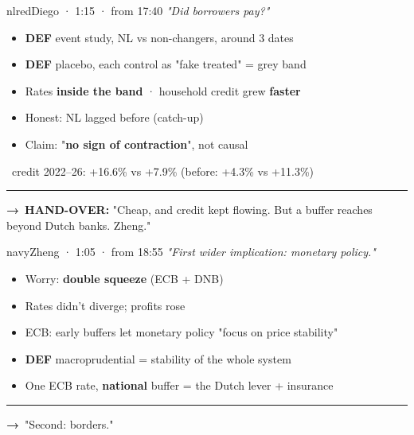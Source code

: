 \documentclass[10pt]{article}
\begin{document}
\begin{card}{nlred}{\hfill{\normalsize\mdseries Diego · 1:15 · from 17:40}}
{\large\itshape "Did borrowers pay?"}\par\smallskip
\begin{itemize}[label=\textcolor{nlred}{\textbullet}]\item \textcolor{gold!80!black}{\textbf{DEF}} event study, NL vs non-changers, around 3 dates\item \textcolor{gold!80!black}{\textbf{DEF}} placebo, each control as "fake treated" = grey band\item Rates \textbf{inside the band} · household credit grew \textbf{faster}\item Honest: NL lagged before (catch-up)\item Claim: "\textbf{no sign of contraction}", not causal\end{itemize}
\smallskip{\color{nlred}\textbf{\#}}\ credit 2022–26: +16.6\% vs +7.9\% (before: +4.3\% vs +11.3\%)\par
\vfill\textcolor{grey}{\rule{\linewidth}{0.3pt}}\par{\bfseries\color{nlred}→}\ \textbf{\textcolor{nlred}{\textbf{HAND-OVER:}}} "Cheap, and credit kept flowing. But a buffer reaches beyond Dutch banks. Zheng."
\end{card}
\hfill
\begin{card}{navy}{\hfill{\normalsize\mdseries Zheng · 1:05 · from 18:55}}
{\large\itshape "First wider implication: monetary policy."}\par\smallskip
\begin{itemize}[label=\textcolor{navy}{\textbullet}]\item Worry: \textbf{double squeeze} (ECB + DNB)\item Rates didn't diverge; profits rose\item ECB: early buffers let monetary policy "focus on price stability"\item \textcolor{gold!80!black}{\textbf{DEF}} macroprudential = stability of the whole system\item One ECB rate, \textbf{national} buffer = the Dutch lever + insurance\end{itemize}
\vfill\textcolor{grey}{\rule{\linewidth}{0.3pt}}\par{\bfseries\color{navy}→}\ "Second: borders."
\end{card}


\vspace{0.35cm}
\end{document}
